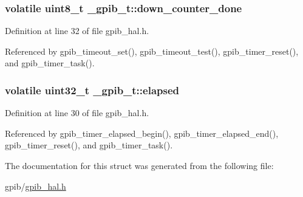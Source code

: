\subsubsection[{\texorpdfstring{down\+\_\+counter\+\_\+done}{down_counter_done}}]{\setlength{\rightskip}{0pt plus 5cm}volatile uint8\+\_\+t \+\_\+gpib\+\_\+t\+::down\+\_\+counter\+\_\+done}\hypertarget{struct__gpib__t_af2622dd8668ecb24c42a2da2d8956538}{}\label{struct__gpib__t_af2622dd8668ecb24c42a2da2d8956538}


Definition at line 32 of file gpib\+\_\+hal.\+h.



Referenced by gpib\+\_\+timeout\+\_\+set(), gpib\+\_\+timeout\+\_\+test(), gpib\+\_\+timer\+\_\+reset(), and gpib\+\_\+timer\+\_\+task().

\subsubsection[{\texorpdfstring{elapsed}{elapsed}}]{\setlength{\rightskip}{0pt plus 5cm}volatile uint32\+\_\+t \+\_\+gpib\+\_\+t\+::elapsed}\hypertarget{struct__gpib__t_a99a38aef880eb075f625f33d7bac31dd}{}\label{struct__gpib__t_a99a38aef880eb075f625f33d7bac31dd}


Definition at line 30 of file gpib\+\_\+hal.\+h.



Referenced by gpib\+\_\+timer\+\_\+elapsed\+\_\+begin(), gpib\+\_\+timer\+\_\+elapsed\+\_\+end(), gpib\+\_\+timer\+\_\+reset(), and gpib\+\_\+timer\+\_\+task().



The documentation for this struct was generated from the following file\+:\begin{DoxyCompactItemize}
\item 
gpib/\hyperlink{gpib__hal_8h}{gpib\+\_\+hal.\+h}\end{DoxyCompactItemize}
